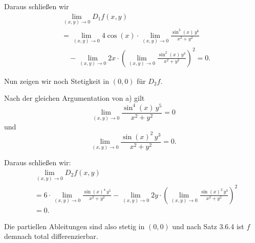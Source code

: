 \documentclass[a4paper,12pt]{article}
\begin{document}
\begin{enumerate}[label=\alph*)]
    Daraus schließen wir
    \begin{align*}
        &\lim_{(x,y) \to 0} D_1 f(x,y) \\
        &= \lim_{(x,y) \to 0} 4 \cos(x) \cdot \lim_{(x,y) \to 0} \frac{\sin^3(x) \, y^6}{x^2 + y^2} \\
        &\quad - \lim_{(x,y) \to 0} 2x \cdot \left( \lim_{(x,y) \to 0} \frac{\sin^2(x) \, y^3}{x^2 + y^2} \right)^2 = 0.
    \end{align*}

    Nun zeigen wir noch Stetigkeit in $(0,0)$ für $D_2 f$.

    Nach der gleichen Argumentation von a) gilt
    \[
        \lim_{(x,y) \to 0} \frac{\sin^4(x) \, y^5}{x^2 + y^2} = 0
    \]
    und
    \[
        \lim_{(x,y) \to 0} \frac{\sin(x)^2 \, y^3}{x^2 + y^2} = 0.
    \]

    Daraus schließen wir:
    \begin{align*}
        &\lim_{(x,y) \to 0} D_2 f(x,y) \\
        &= 6 \cdot \lim_{(x,y) \to 0} \frac{\sin(x)^4 \, y^5}{x^2 + y^2} - \lim_{(x,y) \to 0} 2y \cdot \left( \lim_{(x,y) \to 0} \frac{\sin(x)^2 \, y^3}{x^2 + y^2} \right)^2 \\
        &= 0.
    \end{align*}

    Die partiellen Ableitungen sind also stetig in $(0,0)$ und nach Satz 3.6.4 ist $f$ demnach total differenzierbar.

\end{enumerate}
\end{document}
